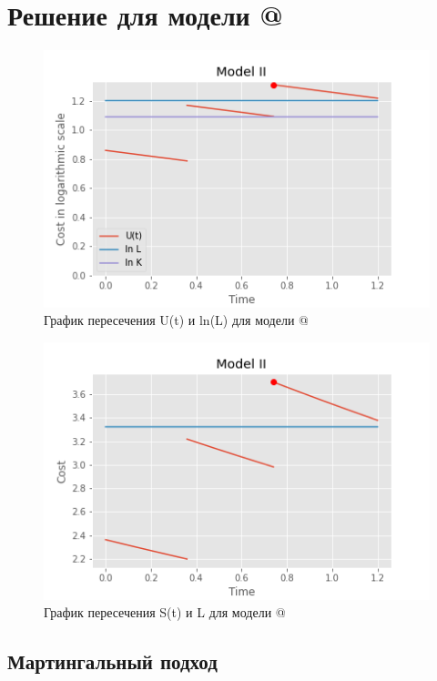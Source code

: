 \documentclass[a4paper,12pt]{article}
\makeatletter
\theoremstyle{definition}
\newcommand*{\rom}[1]{\expandafter\@slowromancap\romannumeral #1@}
\makeatother
\begin{document}
\section{Решение для модели \rom{2}}


\begin{figure}[htbp]
\label{fig:model2tracklcrosslog}
\centerline{\includegraphics[scale=0.7]{img/model2_with_L_log.png}}
\caption{График пересечения U(t) и ln(L) для модели \rom{2}}
\end{figure}


\begin{figure}[htbp]
\label{fig:model2tracklcross}
\centerline{\includegraphics[scale=0.7]{img/model2_with_L.png}}
\caption{График пересечения S(t) и L для модели \rom{2}}
\end{figure}

\subsection{Мартингальный подход}
\end{document}
